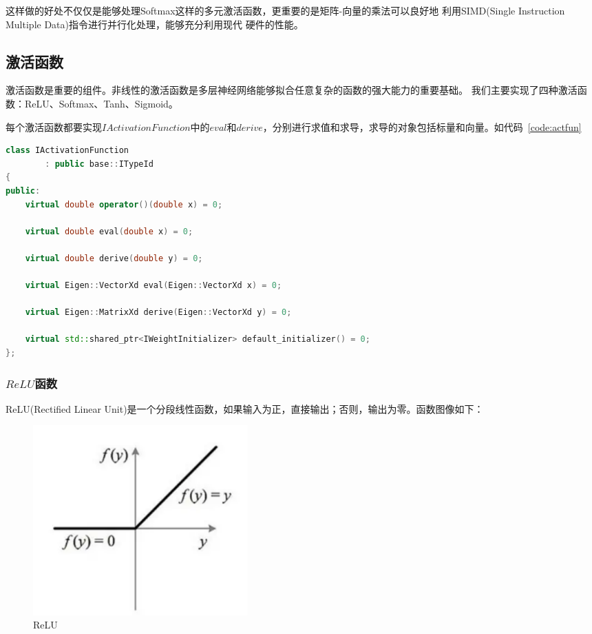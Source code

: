 \documentclass[a4paper,twoside,twocolumn]{article}
\begin{document}
\begin{spacing}{1.2}
这样做的好处不仅仅是能够处理Softmax这样的多元激活函数，更重要的是矩阵-向量的乘法可以良好地
利用SIMD(Single Instruction Multiple Data)指令进行并行化处理，能够充分利用现代
硬件的性能。

\subsection{激活函数}
激活函数是重要的组件。非线性的激活函数是多层神经网络能够拟合任意复杂的函数的强大能力的重要基础。
我们主要实现了四种激活函数：ReLU、Softmax、Tanh、Sigmoid。

每个激活函数都要实现$IActivationFunction$中的$eval$和$derive$，分别进行求值和求导，求导的对象包括标量和向量。如代码~\ref{code:actfun}

\begin{lstlisting}[language=c++,style=CppStyle,caption={接口$IActivationFunction$},label={code:actfun}]
class IActivationFunction
        : public base::ITypeId
{
public:
    virtual double operator()(double x) = 0;

    virtual double eval(double x) = 0;

    virtual double derive(double y) = 0;

    virtual Eigen::VectorXd eval(Eigen::VectorXd x) = 0;

    virtual Eigen::MatrixXd derive(Eigen::VectorXd y) = 0;

    virtual std::shared_ptr<IWeightInitializer> default_initializer() = 0;
};
\end{lstlisting}

\subsubsection{$ReLU$函数}

ReLU(Rectified Linear Unit)是一个分段线性函数，如果输入为正，直接输出；否则，输出为零。函数图像如下：

\begin{figure}[htb]
	\centering
	\caption{ReLU}
	\label{fig:relu}
	\includegraphics[width=0.4\textwidth]{relu.png}
\end{figure}



\end{spacing}
\end{document}
